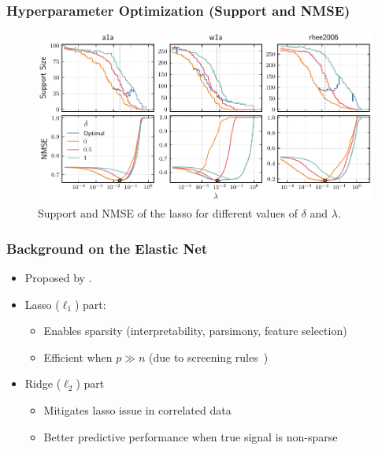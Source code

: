 \documentclass[aspectratio=1610,onlytextwidth]{beamer}
\begin{document}
\begin{frame}[c]
  \frametitle{Hyperparameter Optimization (Support and NMSE)}

  \begin{figure}[htpb]
    \centering
    \includegraphics[width=\textwidth]{figures/hyperopt_paths.pdf}
    \caption{%
      Support and NMSE of the lasso for different values of \(\delta\) and \(\lambda\).
    }
  \end{figure}
\end{frame}

\begin{frame}[c]
  \frametitle{Background on the Elastic Net}

  \begin{itemize}
    \item<1-> Proposed by \textcite{zou2005}.
    \item<2-> Lasso (\(\ell_1\)) part:
          \begin{itemize}
            \item Enables sparsity (interpretability, parsimony, feature selection)
            \item Efficient when \(p \gg n\) (due to screening rules~\parencite{elghaoui2010,tibshirani2012})
          \end{itemize}
    \item<3-> Ridge (\(\ell_2\)) part
          \begin{itemize}
            \item Mitigates lasso issue in correlated data
            \item Better predictive performance when true signal is non-sparse
          \end{itemize}
  \end{itemize}
\end{frame}
\end{document}
